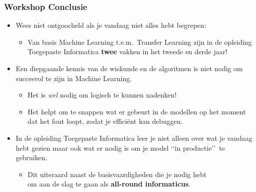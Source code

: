\documentclass[aspectratio=169]{beamer}
\begin{document}
%

\begin{frame}
\frametitle{Workshop Conclusie}
\begin{itemize}
\item Wees niet ontgoocheld als je vandaag niet alles hebt begrepen:
\begin{itemize}
	\item Van basis Machine Learning t.e.m.\ Transfer Learning zijn in de opleiding Toegepaste Informatica \textbf{twee} vakken in het tweede en derde jaar!
\end{itemize}
\item Een diepgaande kennis van de wiskunde en de algoritmen is niet nodig om succesvol te zijn in Machine Learning.
\begin{itemize}
	\item Het is \emph{wel}\/ nodig om logisch te kunnen nadenken!
	\item Het helpt om te snappen wat er gebeurt in de modellen op het moment dat het fout loopt, zodat je effici\"ent kan 
	debuggen.
\end{itemize}
\item In de opleiding Toegepaste Informatica leer je niet alleen over wat je vandaag hebt gezien maar ook 
wat er nodig is om je model \lq\lq in productie\rq\rq\ te gebruiken.
\begin{itemize}
	\item Dit uiteraard naast de basisvaardigheden die je nodig hebt\\ om aan de slag te gaan
	 als \textbf{all-round informaticus}.
\end{itemize}
\end{itemize}
\end{frame}
\end{document}
